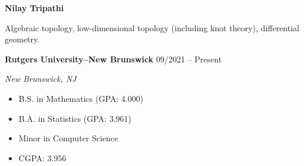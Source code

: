 \documentclass{article}
\begin{document}
		\begin{center}
				\LARGE \textbf{Nilay Tripathi}
		\end{center}
		
		\begin{multicols}{2}
				 \par 
				 \par 
				 \par 
				 \par 
				 \par 
		\end{multicols}		

		\vspace{1.0em}

		\noindent Algebraic topology, low-dimensional topology (including knot theory), differential geometry.

		\vspace{1.0em}

		\noindent \textbf{Rutgers University--New Brunswick} \hfill 09/2021 -- Present \par 
		\noindent \textit{New Brunswick, NJ} 
		\begin{itemize}[noitemsep, nolistsep]
				\item B.S. in Mathematics (GPA: 4.000) 
				\item B.A. in Statistics (GPA: 3.961)
				\item Minor in Computer Science 
				\item CGPA: 3.956
		\end{itemize}
		\vspace{1.0em}
\end{document}
